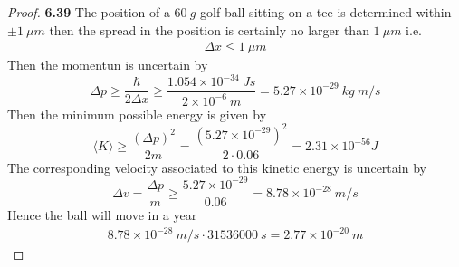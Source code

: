 \documentclass[11pt]{article}
\theoremstyle{definition}
\begin{document}
\cleardoublepage
\begin{proof}{\textbf{6.39}}
    The position of a $60~g$ golf ball sitting on a tee is determined within
    $\pm1~\mu m$ then the spread in the position is certainly no larger than
    $1~\mu m$ i.e.
    \begin{align*}
        \Delta x \leq 1~\mu m
    \end{align*}
    Then the momentun is uncertain by
    $$\Delta p \geq \frac{\hbar}{2\Delta x}
    \geq \frac{1.054 \times 10^{-34}~Js}{2\times 10^{-6}~m}
    = 5.27\times 10^{-29}~kg~m/s$$
    Then the minimum possible energy is given by
    $$\langle K\rangle \geq \frac{(\Delta p)^2}{2m}
    = \frac{(5.27\times 10^{-29})^2}{2\cdot 0.06}
    =2.31 \times 10^{-56} J$$
    The corresponding velocity associated to this kinetic energy is uncertain
    by
    $$\Delta v = \frac{\Delta p}{m} \geq
    \frac{5.27 \times 10^{-29}}{0.06} = 8.78 \times 10^{-28}~m/s$$
    Hence the ball will move in a year
    \begin{align*}
        8.78 \times 10^{-28}~m/s \cdot 31536000~s = 2.77 \times 10^{-20}~m 
    \end{align*}
\end{proof}
\cleardoublepage
\end{document}
